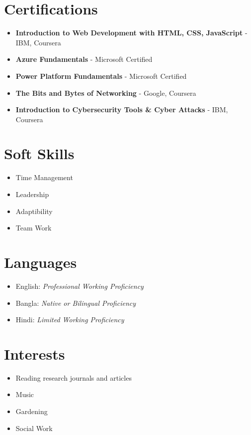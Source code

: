 \documentclass[a4paper,11pt]{article}
\newcommand{\resumeItemListStart}{\begin{justify}\begin{itemize}[leftmargin=3ex, rightmargin=2ex, noitemsep,labelsep=1.2mm,itemsep=0mm]\small}
\newcommand{\resumeItemListEnd}{\end{itemize}\end{justify}\vspace{-2mm}}
\begin{document}
\vspace{-1mm}
\section{\textbf{Certifications}}
    \resumeItemListStart
        \item {\textbf{Introduction to Web Development with HTML, CSS, JavaScript}}
        {- IBM, Coursera} %
        \item {\textbf{Azure Fundamentals}}
        {- Microsoft Certified} %
        \item {\textbf{Power Platform Fundamentals}}
        {- Microsoft Certified} %
        \item {\textbf{The Bits and Bytes of Networking}}
        {- Google, Coursera} %
        \item {\textbf{Introduction to Cybersecurity Tools \& Cyber Attacks}}
        {- IBM, Coursera} %
    \resumeItemListEnd
\vspace{-4mm}
\section{\textbf{Soft Skills}}
    \resumeItemListStart
    \item {Time Management}
    \item {Leadership}
    \item {Adaptibility}
    \item {Team Work}
\resumeItemListEnd
\vspace{-4mm}
\section{\textbf{Languages}}
    \resumeItemListStart
    \item English: \textit{Professional Working Proficiency}
    \item Bangla: \textit{Native or Bilingual Proficiency}
    \item Hindi: \textit{Limited Working Proficiency}
\resumeItemListEnd
\vspace{-4mm}
\section{\textbf{Interests}}
    \resumeItemListStart
    \item {Reading research journals and articles}
    \item {Music}
    \item {Gardening}
    \item {Social Work}
\resumeItemListEnd
\vspace{-4mm}
\end{document}
